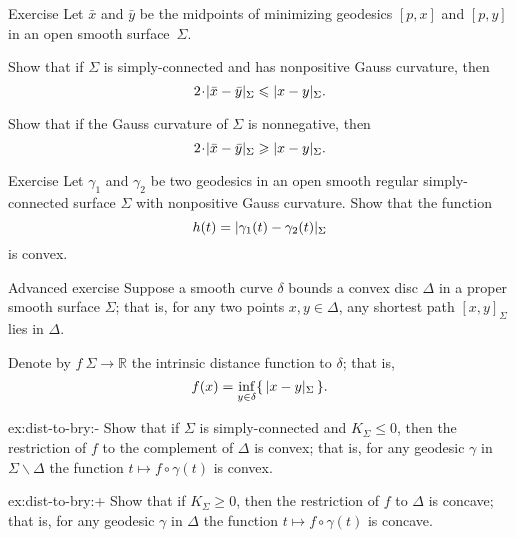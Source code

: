 \begin{thm}{Exercise}\label{ex:midpoints}
Let $\bar x$ and $\bar y$ be the midpoints of minimizing geodesics $[p,x]$ and $[p,y]$ in an open smooth surface~$\Sigma$.

\begin{subthm}{}
Show that if $\Sigma$ is simply-connected and has nonpositive Gauss curvature, then 
\[2\cdot \dist{\bar x}{\bar y}\Sigma\le \dist{x}{y}\Sigma.\]
\end{subthm}
 
\begin{subthm}{} Show that if the Gauss curvature of $\Sigma$ is nonnegative, then 
 \[2\cdot \dist{\bar x}{\bar y}\Sigma\ge \dist{x}{y}\Sigma.\]
\end{subthm}

\end{thm}

\begin{thm}{Exercise}\label{ex:convex-dist}
Let $\gamma_1$ and $\gamma_2$ be two geodesics in an open smooth regular simply-connected surface $\Sigma$ with nonpositive Gauss curvature.
Show that the function
\[h(t)=\dist{\gamma_1(t)}{\gamma_2(t)}\Sigma\]
is convex.
\end{thm}

\begin{thm}{Advanced exercise}\label{ex:dist-to-bry}
Suppose a smooth curve $\delta$ bounds a convex disc $\Delta$ in a proper smooth surface $\Sigma$;
that is, for any two points $x,y\in\Delta$, any shortest path $[x,y]_\Sigma$ lies in $\Delta$.

Denote by $f\:\Sigma\to\mathbb{R}$ the intrinsic distance function to $\delta$;
that is, 
\[f(x)=\inf_{y\in\delta}\{\,\dist{x}{y}\Sigma\,\}.\]

\begin{subthm}{ex:dist-to-bry:-}
Show that if $\Sigma$ is simply-connected and $K_\Sigma\le 0$, then the restriction of $f$ to the complement of $\Delta$ is convex;
that is, for any geodesic $\gamma$ in $\Sigma\backslash\Delta$ the function $t\mapsto f\circ\gamma(t)$ is convex.
\end{subthm}

\begin{subthm}{ex:dist-to-bry:+}
Show that if $K_\Sigma\ge 0$, then the restriction of $f$ to $\Delta$ is concave;
that is, for any geodesic $\gamma$ in $\Delta$ the function $t\mapsto f\circ\gamma(t)$ is concave.
\end{subthm}

\end{thm}

